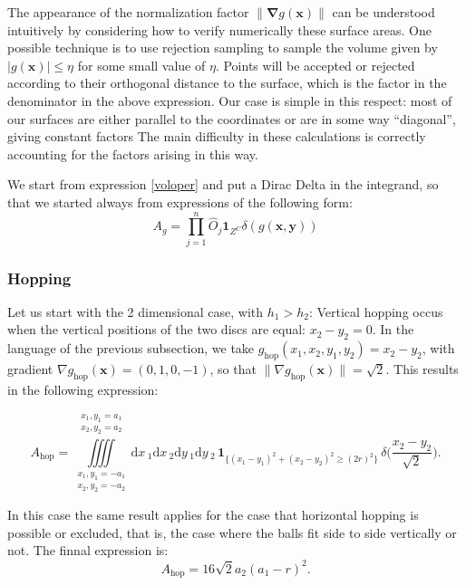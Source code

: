 \documentclass[superscriptaddress,pre,reprint,showpacs,twocolumn]{revtex4-1}
\newcommand{\rd}[1]{\mathrm{d}{#1} \,}
\newcommand{\indicatorsymbol}{\mathbf{1}}
\newcommand{\indicator}[1]{\indicatorsymbol_{ \{   #1 \} } }
\begin{document}
The appearance of the normalization factor $\| \mathbf{\nabla}g(\mathbf{x}) \|$ can be understood intuitively by considering how to verify numerically these surface areas. One possible technique is to use rejection sampling to sample the volume given by $|g(\mathbf{x})| \le \eta$ for some small value of $\eta$. Points will be accepted or rejected according to their orthogonal distance to the surface, which is the factor in the denominator in the above expression. Our case is simple in this respect: most of our surfaces are either parallel to the coordinates or are in some way ``diagonal'', giving constant factors
The main difficulty in these calculations is correctly accounting for the factors arising in this way.

We start from expression \eqref{voloper} and put a Dirac Delta
in the integrand, so that we started always from expressions of the following
form:
\begin{equation}\label{areagral}
A_{g} = \prod_{j=1}^n \hat{O}_j \mathbf{1}_{Z^C} \delta(g(\mathbf{x, y}))
\end{equation}

\subsubsection{Hopping}

Let us start with the 2 dimensional case, with $h_1 > h_2$:
Vertical hopping occus when the vertical positions of the two discs are equal: $x_2 - y_2=0$. In the language of the previous subsection, we take
 $g_\mathrm{hop}(x_1, x_2, y_1, y_2)= x_2 - y_2$, with gradient  $\nabla g_\mathrm{hop}(\mathbf{x}) = (0, 1, 0, -1)$, so that $ \| \nabla g_\mathrm{hop}(\mathbf{x}) \| = \sqrt{2}$. 
This results in the following expression:
\begin{widetext}
\begin{equation}
  A_\text{hop} =
\iiiint
\limits_{\substack{x_1, y_1 = -a_1 \\ x_2, y_2 = -a_2}}^{\substack{x_1, y_1 = a_1 \\ x_2, y_2 = a_2}}
\rd x_1 \rd x_2 \rd y_1 \rd y_2 
 \, \indicator{ (x_1-y_1)^2 + (x_2-y_2)^2 \ge (2r)^2 } \, \delta \big(\frac{x_2-y_2}{\sqrt{2}}\big).
\end{equation}
\end{widetext}
In this case the same result applies for the case that
horizontal hopping is possible or excluded, that is,
the case where the balls fit side to side vertically or not.
The finnal expression is:
 \begin{equation}\label{AreaH}
 A_\text{hop}  =  16 \sqrt{2} a_2(a_1-r)^2.
 \end{equation}
\end{document}
